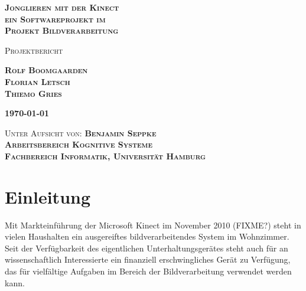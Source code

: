 \documentclass[12pt,a4paper,ngerman]{scrartcl}
\begin{document}
\begin{titlepage}

\vspace*{3 cm}

\begin{flushright}

\bfseries{\Huge\scshape Jonglieren mit der Kinect\\{\Large ein Softwareprojekt im}\\\vspace{0.3cm}Projekt Bildverarbeitung}
\end{flushright}

\vspace{2 cm}

\begin{flushright}
\scshape{\large Projektbericht}
\end{flushright}

\begin{flushright}
\scshape{\LARGE\bfseries Rolf Boomgaarden\\}
\scshape{\LARGE\bfseries Florian Letsch\\}
\scshape{\LARGE\bfseries Thiemo Gries\\}
\end{flushright}

\vspace{2 cm}

\begin{flushright}
\scshape{\large\bfseries \today}
\end{flushright}

\vfill

\begin{flushright}

\scshape{Unter Aufsicht von: {\bfseries Benjamin Seppke}\\}
\scshape{\bfseries Arbeitsbereich Kognitive Systeme\\}
\scshape{\bfseries Fachbereich Informatik, Universität Hamburg\\}
\end{flushright}

\end{titlepage}

\tableofcontents
\newpage

\section{Einleitung}

Mit Markteinführung der Microsoft Kinect im November 2010 (FIXME?) steht in vielen
Haushalten ein ausgereiftes bildverarbeitendes System im Wohnzimmer. Seit der
Verfügbarkeit des eigentlichen Unterhaltungsgerätes steht auch für an
wissenschaftlich Interessierte ein finanziell erschwingliches Gerät zu Verfügung,
das für vielfältige Aufgaben im Bereich der Bildverarbeitung verwendet werden kann.
\end{document}
